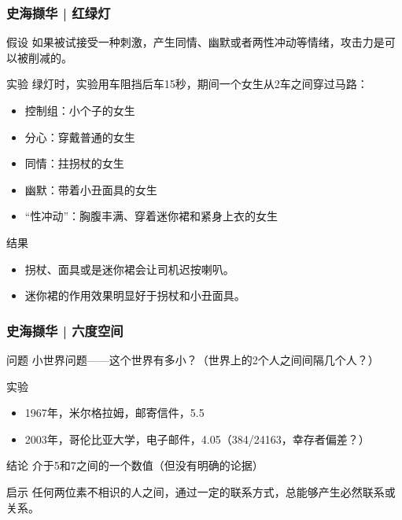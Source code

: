 \begin{frame}
  \frametitle{史海撷华 | 红绿灯}
  \begin{block}{假设}
    如果被试接受一种刺激，产生同情、幽默或者两性冲动等情绪，攻击力是可以被削减的。
  \end{block}
  \vspace{-0.4em}
  \pause
  \begin{block}{实验}
    绿灯时，实验用车阻挡后车15秒，期间一个女生从2车之间穿过马路：
    \begin{itemize}
      \item 控制组：小个子的女生
      \item 分心：穿戴普通的女生
      \item 同情：拄拐杖的女生
      \item 幽默：带着小丑面具的女生
      \item “性冲动”：胸腹丰满、穿着迷你裙和紧身上衣的女生
    \end{itemize}
  \end{block}
  \vspace{-0.4em}
  \pause
  \begin{block}{结果}
    \begin{itemize}
      \item 拐杖、面具或是迷你裙会让司机迟按喇叭。
      \item 迷你裙的作用效果明显好于拐杖和小丑面具。
    \end{itemize}
  \end{block}
\end{frame}

\begin{frame}
  \frametitle{史海撷华 | 六度空间}
  \begin{block}{问题}
    小世界问题——这个世界有多小？（世界上的2个人之间间隔几个人？）
  \end{block}
  \pause
  \begin{block}{实验}
    \begin{itemize}
      \item 1967年，米尔格拉姆，邮寄信件，5.5
      \item 2003年，哥伦比亚大学，电子邮件，4.05（384/24163，幸存者偏差？）
    \end{itemize}
  \end{block}
  \pause
  \begin{block}{结论}
    介于5和7之间的一个数值（但没有明确的论据）
  \end{block}
  \pause
  \begin{block}{启示}
    任何两位素不相识的人之间，通过一定的联系方式，总能够产生必然联系或关系。
  \end{block}
\end{frame}


